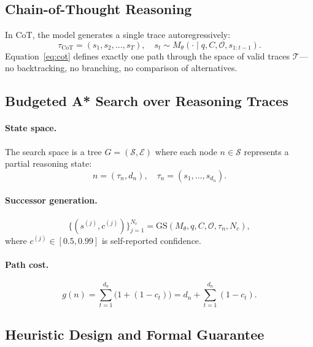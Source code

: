 \documentclass[11pt]{article}
\begin{document}
\subsection{Chain-of-Thought Reasoning}

In CoT, the model generates a single trace autoregressively:
\begin{equation}
  \tau_{\mathrm{CoT}} = (s_1, s_2, \ldots, s_T), \quad
  s_t \sim M_\theta(\cdot \mid q, C, \mathcal{O}, s_{1:t-1}).
  \label{eq:cot}
\end{equation}
Equation~\eqref{eq:cot} defines exactly one path through the space of valid traces $\mathcal{T}$—no backtracking, no branching, no comparison of alternatives.

\subsection{Budgeted A* Search over Reasoning Traces}

\paragraph{State space.}
The search space is a tree $G = (\mathcal{S}, \mathcal{E})$ where each node $n \in \mathcal{S}$ represents a partial reasoning state:
\begin{equation}
  n = (\tau_n, d_n), \quad \tau_n = (s_1, \ldots, s_{d_n}).
  \label{eq:state}
\end{equation}

\paragraph{Successor generation.}
\begin{equation}
  \{(s^{(j)}, c^{(j)})\}_{j=1}^{N_c} = \mathrm{GS}(M_\theta, q, C, \mathcal{O}, \tau_n, N_c),
  \label{eq:successor}
\end{equation}
where $c^{(j)} \in [0.5, 0.99]$ is self-reported confidence.

\paragraph{Path cost.}
\begin{equation}
  g(n) = \sum_{t=1}^{d_n} \bigl(1 + (1 - c_t)\bigr) = d_n + \sum_{t=1}^{d_n}(1 - c_t).
  \label{eq:cost}
\end{equation}

\subsection{Heuristic Design and Formal Guarantee}
\end{document}
